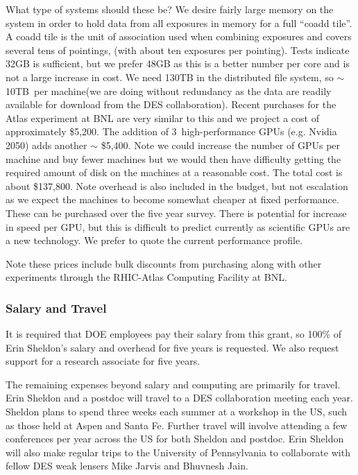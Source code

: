 \documentclass[12pt]{article}
\newcommand{\ngpus}{3}
\newcommand{\basecost}{\$5,200}
\newcommand{\costgpu}{\$5,400}
\newcommand{\diskper}{10TB}
\newcommand{\totalcost}{\$137,800}
\begin{document}
What type of systems should these be?  We desire fairly large memory on the
system in order to hold data from all exposures in memory for a full ``coadd
tile''. A coadd tile is the unit of association used when combining exposures
and covers several tens of pointings, (with about ten exposures per pointing).
Tests indicate 32GB is sufficient, but we prefer 48GB as this is a better
number per core and is not a large increase in cost.  We need 130TB in the
distributed file system, so $\sim$ \diskper\ per machine(we are doing without
redundancy as the data are readily available for download from the DES
collaboration).  Recent purchases for the Atlas experiment at BNL are very
similar to this and we project a cost of approximately \basecost.  The addition
of \ngpus\ high-performance GPUs (e.g.  Nvidia 2050) adds another $\sim$
\costgpu. Note we could increase the number of GPUs per machine and buy fewer
machines but we would then have difficulty getting the required amount of disk
on the machines at a reasonable cost.  The total cost is about \totalcost.
Note overhead is also included in the budget, but not escalation as we expect
the machines to become somewhat cheaper at fixed performance.  These can be
purchased over the five year survey.  There is potential for increase in speed
per GPU, but this is difficult to predict currently as scientific GPUs are a
new technology.  We prefer to quote the current performance profile.

Note these prices include bulk discounts from purchasing along with other
experiments through the RHIC-Atlas Computing Facility at BNL.  



\subsubsection{Salary and Travel}

It is required that DOE employees pay their salary from this grant, so 100\% of
Erin Sheldon's salary and overhead for five years is requested.  We also request
support for a research associate for five years.

The remaining expenses beyond salary and computing are primarily for travel.
Erin Sheldon and a postdoc will travel to a DES collaboration meeting each
year.  Sheldon plans to spend three weeks each summer at a workshop in the US,
such as those held at Aspen and Santa Fe.  Further travel will involve
attending a few conferences per year across the US for both Sheldon and
postdoc.  Erin Sheldon will also make regular trips to the University of
Pennsylvania to collaborate with fellow DES weak lensers Mike Jarvis and
Bhuvnesh Jain.
\end{document}
